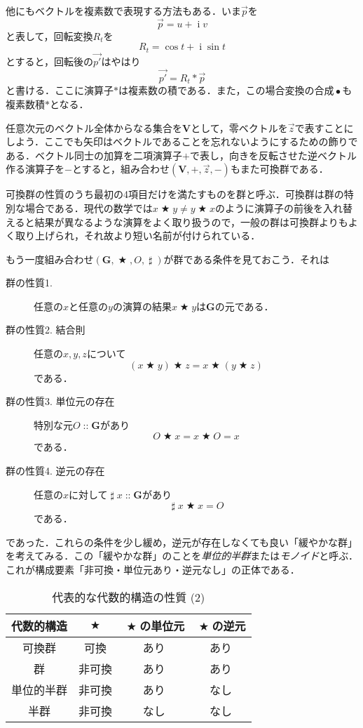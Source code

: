 \documentclass[twocolumn]{jsbook}
\newcommand{\keyword}[1]{{\emph{#1}}}
\DeclareMathOperator{\mathAnyBinaryOperator}{\bigstar}
\DeclareMathOperator{\mathInverse}{\sharp}
\DeclareMathOperator{\mathCompose}{\bullet}
\DeclareMathOperator{\mathI}{i}
\DeclareMathOperator{\mathIn}{::}
\DeclareMathOperator{\mathInverse}{\neg}
\newcommand{\mathSet}[1]{\mathbf{#1}}
\newcommand{\mathVector}[1]{\vec{#1}}
\newcommand{\mathGroup}[4]{(#1,#2,#3,#4)}
\begin{document}
他にもベクトルを複素数で表現する方法もある．いま$\mathVector{p}$を$$\mathVector{p}=u+\mathI v$$と表して，回転変換$R_t$を$$R_t=\cos t+\mathI\sin t$$とすると，回転後の$\mathVector{p'}$はやはり$$\mathVector{p'}=R_t*\mathVector{p}$$と書ける．ここに演算子$*$は複素数の積である．また，この場合変換の合成$\mathCompose$も複素数積$*$となる．

任意次元のベクトル全体からなる集合を$\mathSet{V}$として，零ベクトルを$\mathVector{z}$で表すことにしよう．ここでも矢印はベクトルであることを忘れないようにするための飾りである．ベクトル同士の加算を二項演算子$+$で表し，向きを反転させた逆ベクトル作る演算子を$-$とすると，組み合わせ$\mathGroup{\mathSet{V}}{+}{\mathVector{z}}{-}$もまた可換群である．

可換群の性質のうち最初の4項目だけを満たすものを群と呼ぶ．可換群は群の特別な場合である．現代の数学では$x\mathAnyBinaryOperator y\neq y\mathAnyBinaryOperator x$のように演算子の前後を入れ替えると結果が異なるような演算をよく取り扱うので，一般の群は可換群よりもよく取り上げられ，それ故より短い名前が付けられている．

もう一度組み合わせ$\mathGroup{\mathSet{G}}{\mathAnyBinaryOperator}{O}{\mathInverse}$が群である条件を見ておこう．それは
\begin{description}
\item[群の性質1.] 任意の$x$と任意の$y$の演算の結果$x\mathAnyBinaryOperator y$は$\mathSet{G}$の元である．
\item[群の性質2. 結合則] 任意の$x,y,z$について$$(x\mathAnyBinaryOperator y)\mathAnyBinaryOperator z=x\mathAnyBinaryOperator(y\mathAnyBinaryOperator z)$$である．
\item[群の性質3. 単位元の存在] 特別な元$O\mathIn\mathSet{G}$があり$$O\mathAnyBinaryOperator x=x\mathAnyBinaryOperator O=x$$である．
\item[群の性質4. 逆元の存在] 任意の$x$に対して$\mathInverse x\mathIn\mathSet{G}$があり$$\mathInverse x\mathAnyBinaryOperator x=O$$である．
\end{description}
であった．これらの条件を少し緩め，逆元が存在しなくても良い「緩やかな群」を考えてみる．この「緩やかな群」のことを\keyword{単位的半群}または\keyword{モノイド}と呼ぶ．これが構成要素「非可換・単位元あり・逆元なし」の正体である．

\begin{table}
\caption{代表的な代数的構造の性質 (2)}
\label{tab:group-and-monoid}
\begin{center}
\begin{tabular}{||c||c|c|c||}
\hline
代数的構造&$\mathAnyBinaryOperator$&$\mathAnyBinaryOperator$の単位元&$\mathAnyBinaryOperator$の逆元\\
\hline\hline
可換群&可換&あり&あり\\
群&非可換&あり&あり\\
単位的半群&非可換&あり&なし\\
半群&非可換&なし&なし\\
\hline
\end{tabular}
\end{center}
\end{table}
\end{document}

